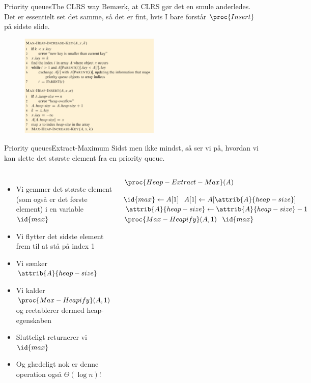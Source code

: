 \documentclass[aspectratio=1610]{beamer}
\begin{document}
\begin{frame}{Priority queues}{The CLRS way}
    Bemærk, at CLRS gør det en smule anderledes. Det er essentielt set det
    samme, så det er fint, hvis I bare forstår $\proc{Insert}$  på sidste slide.

    \begin{figure}[h]
        \centering
        \includegraphics[width=0.6\textwidth]{heaps/max-heap-insert-clrs}
    \end{figure}
\end{frame}

\begin{frame}{Priority queues}{Extract-Maximum}
    Sidst men ikke mindst, så ser vi på, hvordan vi kan slette det største
    element fra en priority queue.

    \begin{columns}
        \begin{itemize}
            \small
            \item Vi gemmer det største element (som også er det første element)
                i en variable $\id{max}$
            \item Vi flytter det sidste element frem til at stå på index 1
            \item Vi sænker $\attrib{A}{heap-size}$
            \item Vi kalder $\proc{Max-Heapify}(A,1)$ og reetablerer dermed
                heap-egenskaben
            \item Slutteligt returnerer vi $\id{max}$
            \item Og glædeligt nok er denne operation også $\Theta(\log n)$!
        \end{itemize}
    
        \begin{block}{$\proc{Heap-Extract-Max}(A)$}
            
            \vspace{-\abovedisplayskip}
            \begin{codebox}
                \li $\id{max} \gets A[1]$
                \li $A[1] \gets A[\attrib{A}{heap-size}]$
                \li $\attrib{A}{heap-size} \gets \attrib{A}{heap-size} - 1$
                \li $\proc{Max-Heapify}(A,1)$
                \li \Return $\id{max}$
            \end{codebox}
        \end{block}
    \end{columns}
\end{frame}
\end{document}
